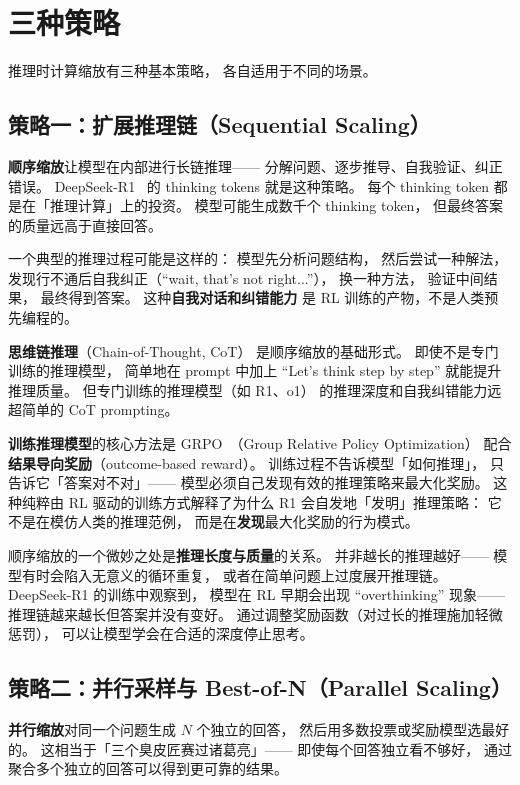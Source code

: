 \section{三种策略}

推理时计算缩放有三种基本策略，
各自适用于不同的场景。

\subsection{策略一：扩展推理链（Sequential Scaling）}

\textbf{顺序缩放}让模型在内部进行长链推理——
分解问题、逐步推导、自我验证、纠正错误。
DeepSeek-R1~\cite{deepseekr1} 的 thinking tokens 就是这种策略。
每个 thinking token 都是在「推理计算」上的投资。
模型可能生成数千个 thinking token，
但最终答案的质量远高于直接回答。

一个典型的推理过程可能是这样的：
模型先分析问题结构，
然后尝试一种解法，
发现行不通后自我纠正（``wait, that's not right...''），
换一种方法，
验证中间结果，
最终得到答案。
这种\textbf{自我对话和纠错能力}
是 RL 训练的产物，不是人类预先编程的。

\textbf{思维链推理}（Chain-of-Thought, CoT）
是顺序缩放的基础形式。
即使不是专门训练的推理模型，
简单地在 prompt 中加上
``Let's think step by step'' 就能提升推理质量。
但专门训练的推理模型（如 R1、o1）
的推理深度和自我纠错能力远超简单的 CoT prompting。

\textbf{训练推理模型}的核心方法是
GRPO~\cite{shao2024grpo}（Group Relative Policy Optimization）
配合\textbf{结果导向奖励}（outcome-based reward）。
训练过程不告诉模型「如何推理」，
只告诉它「答案对不对」——
模型必须自己发现有效的推理策略来最大化奖励。
这种纯粹由 RL 驱动的训练方式解释了为什么
R1 会自发地「发明」推理策略：
它不是在模仿人类的推理范例，
而是在\textbf{发现}最大化奖励的行为模式。

顺序缩放的一个微妙之处是\textbf{推理长度与质量}的关系。
并非越长的推理越好——
模型有时会陷入无意义的循环重复，
或者在简单问题上过度展开推理链。
DeepSeek-R1 的训练中观察到，
模型在 RL 早期会出现 ``overthinking'' 现象——
推理链越来越长但答案并没有变好。
通过调整奖励函数（对过长的推理施加轻微惩罚），
可以让模型学会在合适的深度停止思考。

\subsection{策略二：并行采样与 Best-of-N（Parallel Scaling）}

\textbf{并行缩放}对同一个问题生成 $N$ 个独立的回答，
然后用多数投票或奖励模型选最好的。
这相当于「三个臭皮匠赛过诸葛亮」——
即使每个回答独立看不够好，
通过聚合多个独立的回答可以得到更可靠的结果。

